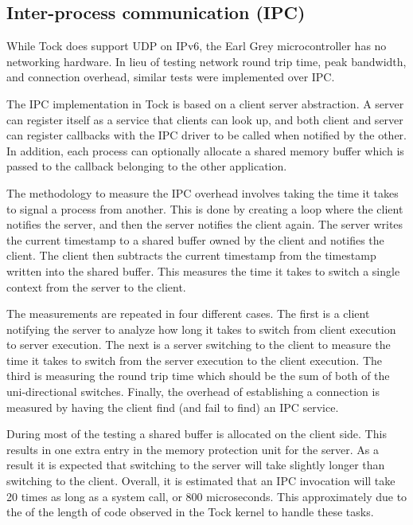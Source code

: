 \documentclass{article}
\begin{document}
\subsection{Inter-process communication (IPC)} \label{ipc-section}

While Tock does support UDP on IPv6, the Earl Grey microcontroller has no networking hardware. In lieu of testing network round trip time, peak bandwidth, and connection overhead, similar tests were implemented over IPC.

The IPC implementation in Tock is based on a client server abstraction. A server can register itself as a service that clients can look up, and both client and server can register callbacks with the IPC driver to be called when notified by the other. In addition, each process can optionally allocate a shared memory buffer which is passed to the callback belonging to the other application.

The methodology to measure the IPC overhead involves taking the time it takes to signal a process from another. This is done by creating a loop where the client notifies the server, and then the server notifies the client again. The server writes the current timestamp to a shared buffer owned by the client and notifies the client. The client then subtracts the current timestamp from the timestamp written into the shared buffer. This measures the time it takes to switch a single context from the server to the client.

The measurements are repeated in four different cases. The first is a client notifying the server to analyze how long it takes to switch from client execution to server execution. The next is a server switching to the client to measure the time it takes to switch from the server execution to the client execution. The third is measuring the round trip time which should be the sum of both of the uni-directional switches. Finally, the overhead of establishing a connection is measured by having the client find (and fail to find) an IPC service.

During most of the testing a shared buffer is allocated on the client side. This results in one extra entry in the memory protection unit for the server. As a result it is expected that switching to the server will take slightly longer than switching to the client. Overall, it is estimated that an IPC invocation will take 20 times as long as a system call, or 800 microseconds. This approximately due to the of the length of code observed in the Tock kernel to handle these tasks.
\end{document}
